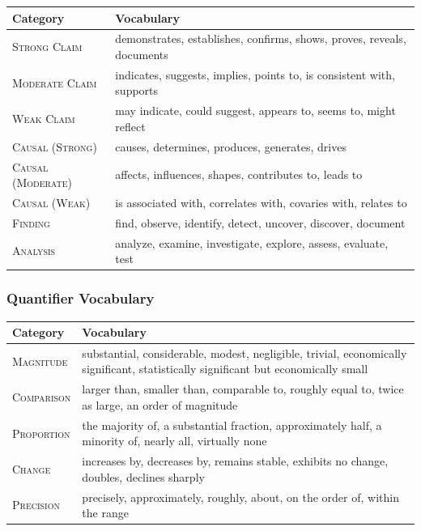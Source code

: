 \begin{center}
\renewcommand{\arraystretch}{1.1}
\small
\begin{tabular}{p{2.5cm}p{10cm}}
\toprule
\textbf{Category} & \textbf{Vocabulary} \\
\midrule
\textsc{Strong Claim} &
  demonstrates, establishes, confirms, shows, proves, reveals, documents \\
\textsc{Moderate Claim} &
  indicates, suggests, implies, points to, is consistent with, supports \\
\textsc{Weak Claim} &
  may indicate, could suggest, appears to, seems to, might reflect \\
\textsc{Causal (Strong)} &
  causes, determines, produces, generates, drives \\
\textsc{Causal (Moderate)} &
  affects, influences, shapes, contributes to, leads to \\
\textsc{Causal (Weak)} &
  is associated with, correlates with, covaries with, relates to \\
\textsc{Finding} &
  find, observe, identify, detect, uncover, discover, document \\
\textsc{Analysis} &
  analyze, examine, investigate, explore, assess, evaluate, test \\
\bottomrule
\end{tabular}
\end{center}

\subsubsection{Quantifier Vocabulary}

\begin{center}
\renewcommand{\arraystretch}{1.1}
\small
\begin{tabular}{p{2.5cm}p{10cm}}
\toprule
\textbf{Category} & \textbf{Vocabulary} \\
\midrule
\textsc{Magnitude} &
  substantial, considerable, modest, negligible, trivial, economically significant,
  statistically significant but economically small \\
\textsc{Comparison} &
  larger than, smaller than, comparable to, roughly equal to, twice as large,
  an order of magnitude \\
\textsc{Proportion} &
  the majority of, a substantial fraction, approximately half, a minority of,
  nearly all, virtually none \\
\textsc{Change} &
  increases by, decreases by, remains stable, exhibits no change, doubles,
  declines sharply \\
\textsc{Precision} &
  precisely, approximately, roughly, about, on the order of, within the range \\
\bottomrule
\end{tabular}
\end{center}

